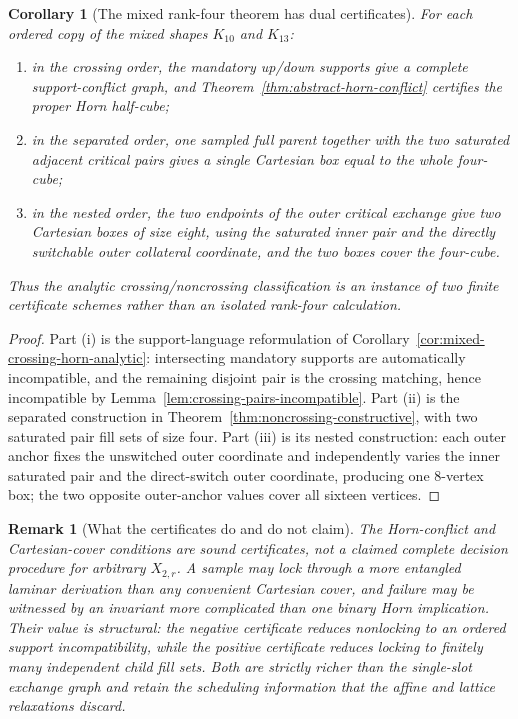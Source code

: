 \documentclass[11pt]{article}
\newtheorem{corollary}[definition]{Corollary}
\newtheorem{remark}[definition]{Remark}
\begin{document}
\begin{corollary}[The mixed rank-four theorem has dual certificates]
\label{cor:mixed-dual-certificates}
For each ordered copy of the mixed shapes $K_{10}$ and $K_{13}$:
\begin{enumerate}[label=\textup{(\roman*)},leftmargin=*]
\item in the crossing order, the mandatory up/down supports give a complete
      support-conflict graph, and
      Theorem~\ref{thm:abstract-horn-conflict} certifies the proper Horn
      half-cube;
\item in the separated order, one sampled full parent together with the two
      saturated adjacent critical pairs gives a single Cartesian box equal to
      the whole four-cube;
\item in the nested order, the two endpoints of the outer critical exchange
      give two Cartesian boxes of size eight, using the saturated inner pair
      and the directly switchable outer collateral coordinate, and the two
      boxes cover the four-cube.
\end{enumerate}
Thus the analytic crossing/noncrossing classification is an instance of two
finite certificate schemes rather than an isolated rank-four calculation.
\end{corollary}

\begin{proof}
Part (i) is the support-language reformulation of
Corollary~\ref{cor:mixed-crossing-horn-analytic}: intersecting mandatory
supports are automatically incompatible, and the remaining disjoint pair is
the crossing matching, hence incompatible by
Lemma~\ref{lem:crossing-pairs-incompatible}.  Part (ii) is the separated
construction in Theorem~\ref{thm:noncrossing-constructive}, with two saturated
pair fill sets of size four.  Part (iii) is its nested construction: each outer
anchor fixes the unswitched outer coordinate and independently varies the
inner saturated pair and the direct-switch outer coordinate, producing one
$8$-vertex box; the two opposite outer-anchor values cover all sixteen
vertices.
\end{proof}

\begin{remark}[What the certificates do and do not claim]
The Horn-conflict and Cartesian-cover conditions are sound certificates, not a
claimed complete decision procedure for arbitrary $X_{2,r}$.  A sample may
lock through a more entangled laminar derivation than any convenient Cartesian
cover, and failure may be witnessed by an invariant more complicated than one
binary Horn implication.  Their value is structural: the negative certificate
reduces nonlocking to an ordered support incompatibility, while the positive
certificate reduces locking to finitely many independent child fill sets.
Both are strictly richer than the single-slot exchange graph and retain the
scheduling information that the affine and lattice relaxations discard.
\end{remark}
\end{document}
